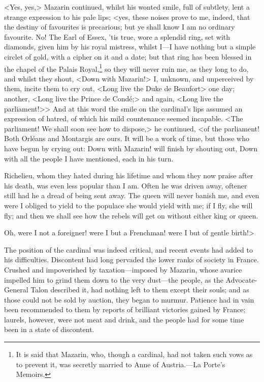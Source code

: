 <Yes, yes,> Mazarin continued, whilst his wonted smile, full of subtlety, lent a strange expression to his pale lips; <yes, these noises prove to me, indeed, that the destiny of favourites is precarious; but ye shall know I am no ordinary favourite. No! The Earl of Essex, 'tis true, wore a splendid ring, set with diamonds, given him by his royal mistress, whilst I—I have nothing but a simple circlet of gold, with a cipher on it and a date; but that ring has been blessed in the chapel of the Palais Royal,\footnote{It is said that Mazarin, who, though a cardinal, had not taken such vows as to prevent it, was secretly married to Anne of Austria.—La Porte's Memoirs.} so they will never ruin me, as they long to do, and whilst they shout, <Down with Mazarin!> I, unknown, and unperceived by them, incite them to cry out, <Long live the Duke de Beaufort> one day; another, <Long live the Prince de Condé;> and again, <Long live the parliament!>> And at this word the smile on the cardinal's lips assumed an expression of hatred, of which his mild countenance seemed incapable. <The parliament! We shall soon see how to dispose,> he continued, <of the parliament! Both Orléans and Montargis are ours. It will be a work of time, but those who have begun by crying out: Down with Mazarin! will finish by shouting out, Down with all the people I have mentioned, each in his turn.

Richelieu, whom they hated during his lifetime and whom they now praise after his death, was even less popular than I am. Often he was driven away, oftener still had he a dread of being sent away. The queen will never banish me, and even were I obliged to yield to the populace she would yield with me; if I fly, she will fly; and then we shall see how the rebels will get on without either king or queen.

Oh, were I not a foreigner! were I but a Frenchman! were I but of gentle birth!>

The position of the cardinal was indeed critical, and recent events had added to his difficulties. Discontent had long pervaded the lower ranks of society in France. Crushed and impoverished by taxation—imposed by Mazarin, whose avarice impelled him to grind them down to the very dust—the people, as the Advocate-General Talon described it, had nothing left to them except their souls; and as those could not be sold by auction, they began to murmur. Patience had in vain been recommended to them by reports of brilliant victories gained by France; laurels, however, were not meat and drink, and the people had for some time been in a state of discontent.

